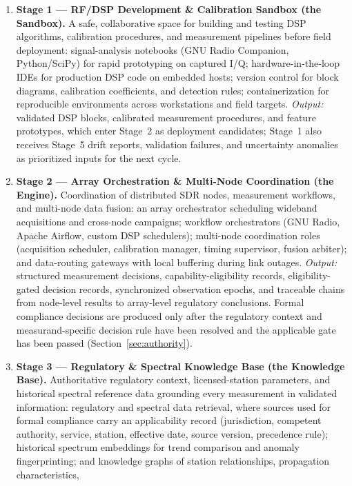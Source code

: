 \documentclass[11pt,a4paper]{article}
\begin{document}
\begin{enumerate}
  \item \textbf{Stage 1 --- RF/DSP Development \& Calibration Sandbox (the Sandbox).} A safe,
    collaborative space for building and testing DSP algorithms, calibration procedures, and
    measurement pipelines before field deployment: signal-analysis notebooks (GNU Radio
    Companion, Python/SciPy) for rapid prototyping on captured I/Q; hardware-in-the-loop IDEs
    for production DSP code on embedded hosts; version control for block diagrams, calibration
    coefficients, and detection rules; containerization for reproducible environments across
    workstations and field targets. \emph{Output:} validated DSP blocks, calibrated measurement
    procedures, and feature prototypes, which enter Stage~2 as deployment candidates; Stage~1
    also receives Stage~5 drift reports, validation failures, and uncertainty anomalies as
    prioritized inputs for the next cycle.
  \item \textbf{Stage 2 --- Array Orchestration \& Multi-Node Coordination (the Engine).}
    Coordination of distributed SDR nodes, measurement workflows, and multi-node data fusion: an
    array orchestrator scheduling wideband acquisitions and cross-node campaigns; workflow
    orchestrators (GNU Radio, Apache Airflow, custom DSP schedulers); multi-node coordination
    roles (acquisition scheduler, calibration manager, timing supervisor, fusion arbiter); and
    data-routing gateways with local buffering during link outages. \emph{Output:} structured
    measurement decisions, capability-eligibility records, eligibility-gated decision records,
    synchronized observation epochs, and traceable chains from node-level results to array-level
    regulatory conclusions. Formal compliance decisions are produced only after the regulatory
    context and measurand-specific decision rule have been resolved and the applicable gate has
    been passed (Section~\ref{sec:authority}).
  \item \textbf{Stage 3 --- Regulatory \& Spectral Knowledge Base (the Knowledge Base).}
    Authoritative regulatory context, licensed-station parameters, and historical spectral
    reference data grounding every measurement in validated information: regulatory and spectral
    data retrieval, where sources used for formal compliance carry an applicability record
    (jurisdiction, competent authority, service, station, effective date, source version,
    precedence rule); historical spectrum embeddings for trend comparison and anomaly
    fingerprinting; and knowledge graphs of station relationships, propagation characteristics,

\end{enumerate}
\end{document}
